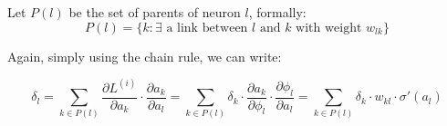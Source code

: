 \documentclass{article}
\begin{document}
Let $P(l)$ be the set of parents of neuron $l$, formally:
\begin{equation} 
P(l) = \{ k: \exists \text{ a link between $l$ and $k$ with weight } w_{lk} \}
\end{equation}

Again, simply using the chain rule, we can write:

$$\delta_l = \sum_{k\in P(l)} \frac{\partial L^{(i)}}{\partial a_k} \cdot \frac{\partial a_k}{\partial a_l}= \sum_{k\in P(l)} \delta_k \cdot 
\frac{\partial a_k}{\partial \phi_l} \cdot \frac{\partial \phi_l}{\partial a_l} = \sum_{k\in P(l)} \delta_k \cdot 
w_{kl} \cdot \sigma'(a_l) $$



\newpage
\nocite{*}		 %
{}

\end{document}
